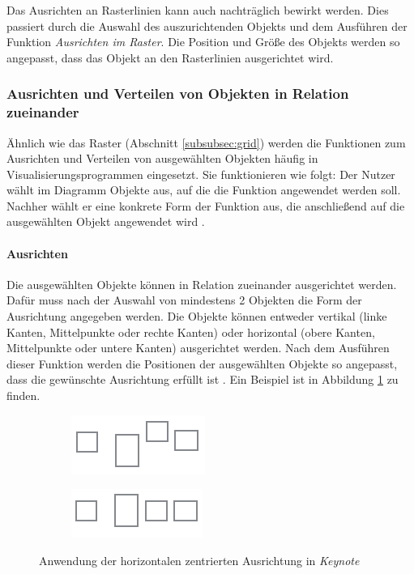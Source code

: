 Das Ausrichten an Rasterlinien kann auch nachträglich bewirkt werden. Dies passiert durch die Auswahl des auszurichtenden Objekts und dem Ausführen der Funktion \textit{Ausrichten im Raster}. Die Position und Größe des Objekts werden so angepasst, dass das Objekt an den Rasterlinien ausgerichtet wird.

\subsubsection{Ausrichten und Verteilen von Objekten in Relation zueinander}
\label{subsubsec:alignment-and-distribution}

Ähnlich wie das Raster (Abschnitt \ref{subsubsec:grid}) werden die Funktionen zum Ausrichten und Verteilen von ausgewählten Objekten häufig in Visualisierungsprogrammen eingesetzt. Sie funktionieren wie folgt: Der Nutzer wählt im Diagramm Objekte aus, auf die die Funktion angewendet werden soll. Nachher wählt er eine konkrete Form der Funktion aus, die anschließend auf die ausgewählten Objekt angewendet wird \cite{11Keynote}.

\paragraph{Ausrichten}

Die ausgewählten Objekte können in Relation zueinander ausgerichtet werden. Dafür muss nach der Auswahl von mindestens 2 Objekten die Form der Ausrichtung angegeben werden. Die Objekte können entweder vertikal (linke Kanten, Mittelpunkte oder rechte Kanten) oder horizontal (obere Kanten, Mittelpunkte oder untere Kanten) ausgerichtet werden. Nach dem Ausführen dieser Funktion werden die Positionen der ausgewählten Objekte so angepasst, dass die gewünschte Ausrichtung erfüllt ist \cite{11Keynote, 08OmniGraffle}. Ein Beispiel ist in Abbildung \ref{fig:keynote-horizontal-alignment} zu finden.

\begin{figure}[hbt]
    \newcommand{\subfigurewidth}{0.5\textwidth}
    \begin{subfigure}{\subfigurewidth}
        \centering
        \includegraphics{resources/keynote-horizontal-alignment-a}
        \caption{}
    \end{subfigure}
    \begin{subfigure}{\subfigurewidth}
        \centering
        \includegraphics{resources/keynote-horizontal-alignment-b}
        \caption{}
    \end{subfigure}
    \caption{Anwendung der horizontalen zentrierten Ausrichtung in \textit{Keynote}}
    \label{fig:keynote-horizontal-alignment}
\end{figure}

